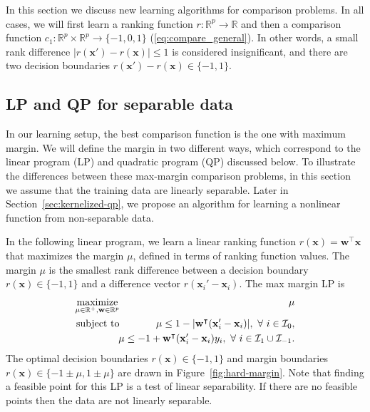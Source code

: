 \documentclass[twoside,11pt]{article}
\newcommand{\RR}{\mathbb R}
\DeclareMathOperator*{\maximize}{maximize}
\begin{document}
In this section we discuss new learning algorithms for comparison
problems. In all cases, we will first learn a ranking function
$r:\RR^p\rightarrow\RR$ and then a comparison function
$c_1:\RR^p\times \RR^p\rightarrow\{-1,0,1\}$
(\ref{eq:compare_general}). In other words, a small rank difference
$|r(\mathbf x')-r(\mathbf x)|\leq 1$ is considered insignificant, and
there are two decision boundaries $r(\mathbf x')-r(\mathbf
x)\in\{-1,1\}$.

\subsection{LP and QP for separable data}
\label{sec:lp-qp}

In our learning setup, the best comparison function is the one with
maximum margin. We will define the margin in two different ways, which
correspond to the linear program (LP) and quadratic program (QP)
discussed below. To illustrate the differences between these
max-margin comparison problems, in this section we assume that the
training data are linearly separable. Later in
Section~\ref{sec:kernelized-qp}, we propose an algorithm for learning
a nonlinear function from non-separable data.

In the following linear program, we learn a linear ranking function
$r(\mathbf x)=\mathbf w^\intercal \mathbf x$ that maximizes the margin
$\mu$, defined in terms of ranking function values. The margin $\mu$
is the smallest rank difference between a decision boundary $r(\mathbf
x)\in\{-1,1\}$ and a difference vector $r(\mathbf x_i'-\mathbf
x_i)$. The max margin LP is
\begin{eqnarray}
  \label{eq:max-margin-lp}
  \maximize_{\mu\in\RR^+, \mathbf w\in\RR^p}\ &&\hskip -0.5cm \mu \\
  \nonumber
  \text{subject to}\ && \hskip -0.5cm \mu \leq
  1-|\mathbf w^\intercal (\mathbf x_i' - \mathbf x_i)|,\ 
  \forall\  i\in \mathcal I_0,\\
  \nonumber
  &&\hskip -0.5cm
  \mu \leq -1 +  \mathbf w^\intercal(\mathbf x_i'-\mathbf x_i)y_i,
  \ \forall\ i\in \mathcal I_1\cup \mathcal I_{-1}.
\end{eqnarray}
The optimal decision boundaries $r(\mathbf x)\in\{-1,1\}$ and margin
boundaries $r(\mathbf x)\in\{-1\pm \mu, 1 \pm \mu\}$ are drawn 
in Figure~\ref{fig:hard-margin}. Note that finding a feasible point
for this LP is a test of linear separability. If there are no feasible
points then the data are not linearly separable.
\end{document}
